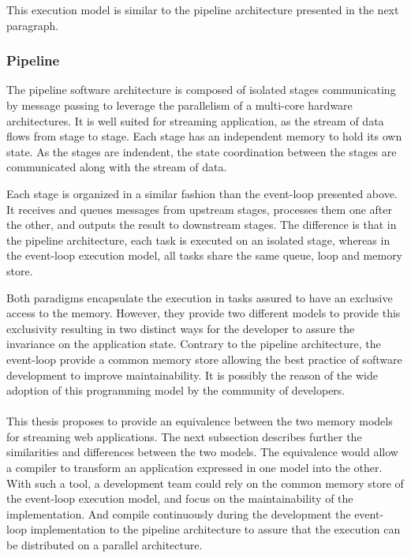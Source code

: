 This execution model is similar to the pipeline architecture presented in the next paragraph.

\subsubsection{Pipeline}

The pipeline software architecture is composed of isolated stages communicating by message passing to leverage the parallelism of a multi-core hardware architectures.
It is well suited for streaming application, as the stream of data flows from stage to stage.
Each stage has an independent memory to hold its own state.
As the stages are indendent, the state coordination between the stages are communicated along with the stream of data.


Each stage is organized in a similar fashion than the event-loop presented above.
It receives and queues messages from upstream stages, processes them one after the other, and outputs the result to downstream stages.
The difference is that in the pipeline architecture, each task is executed on an isolated stage, whereas in the event-loop execution model, all tasks share the same queue, loop and memory store.

Both paradigms encapsulate the execution in tasks assured to have an exclusive access to the memory.
However, they provide two different models to provide this exclusivity resulting in two distinct ways for the developer to assure the invariance on the application state.
Contrary to the pipeline architecture, the event-loop provide a common memory store allowing the best practice of software development to improve maintainability.
It is possibly the reason of the wide adoption of this programming model by the community of developers.

\paragraph{}

This thesis proposes to provide an equivalence between the two memory models for streaming web applications.
The next subsection describes further the similarities and differences between the two models.
The equivalence would allow a compiler to transform an application expressed in one model into the other.
With such a tool, a development team could rely on the common memory store of the event-loop execution model, and focus on the maintainability of the implementation.
And compile continuously during the development the event-loop implementation to the pipeline architecture to assure that the execution can be distributed on a parallel architecture.

